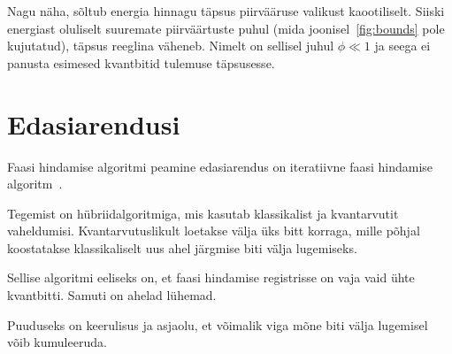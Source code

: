 \documentclass[12pt]{report}
\begin{document}
Nagu näha, sõltub energia hinnagu täpsus piirvääruse valikust kaootiliselt.
Siiski energiast oluliselt suuremate piirväärtuste puhul (mida joonisel~\ref{fig:bounds} pole kujutatud), täpsus reeglina väheneb.
Nimelt on sellisel juhul \(\phi \ll 1\) ja seega ei panusta esimesed kvantbitid tulemuse täpsusesse.

\section{Edasiarendusi}

Faasi hindamise algoritmi peamine edasiarendus on iteratiivne faasi hindamise algoritm~\cite{mcardle+etal, omalley+etal}.

Tegemist on hübriidalgoritmiga, mis kasutab klassikalist ja kvantarvutit vaheldumisi.
Kvantarvutuslikult loetakse välja üks bitt korraga, mille põhjal koostatakse klassikaliselt uus ahel järgmise biti välja lugemiseks.

Sellise algoritmi eeliseks on, et faasi hindamise registrisse on vaja vaid ühte kvantbitti.
Samuti on ahelad lühemad.

Puuduseks on keerulisus ja asjaolu, et võimalik viga mõne biti välja lugemisel võib kumuleeruda.
\end{document}
